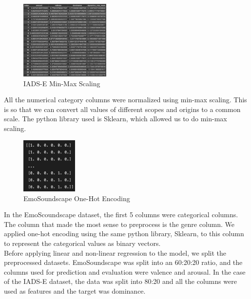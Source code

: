\documentclass[conference]{IEEEtran}
\begin{document}
{\FloatBarrier

\begin{figure}[h]
\caption{IADS-E Min-Max Scaling}
\centering
\includegraphics[width=0.40\textwidth]{Figures/IADSEScaledDf.png}
\end{figure}


\noindent
All the numerical category columns were normalized using min-max scaling. This is so that we can convert all values of different scopes and origins to a common scale. The python library used is Sklearn, which allowed us to do min-max scaling. \\

\FloatBarrier


\begin{figure}[h]
\caption{EmoSoundscape One-Hot Encoding}
\centering
\includegraphics[width=0.25\textwidth]{Figures/one_hot_1.png}
\end{figure}

\FloatBarrier


\noindent
In the EmoScoundscape dataset, the first 5 columns were categorical columns. The column that made the most sense to preprocess is the genre column. We applied one-hot encoding using the same python library, Sklearn, to this column to represent the categorical values as binary vectors. \\


\noindent
Before applying linear and non-linear regression to the model, we split the preprocessed datasets. EmoSoundscape was split into an 60:20:20 ratio, and the columns used for prediction and evaluation were valence and arousal. In the case of the IADS-E dataset, the data was split into 80:20 and all the columns were used as features and the target was dominance.\\

}
\end{document}
